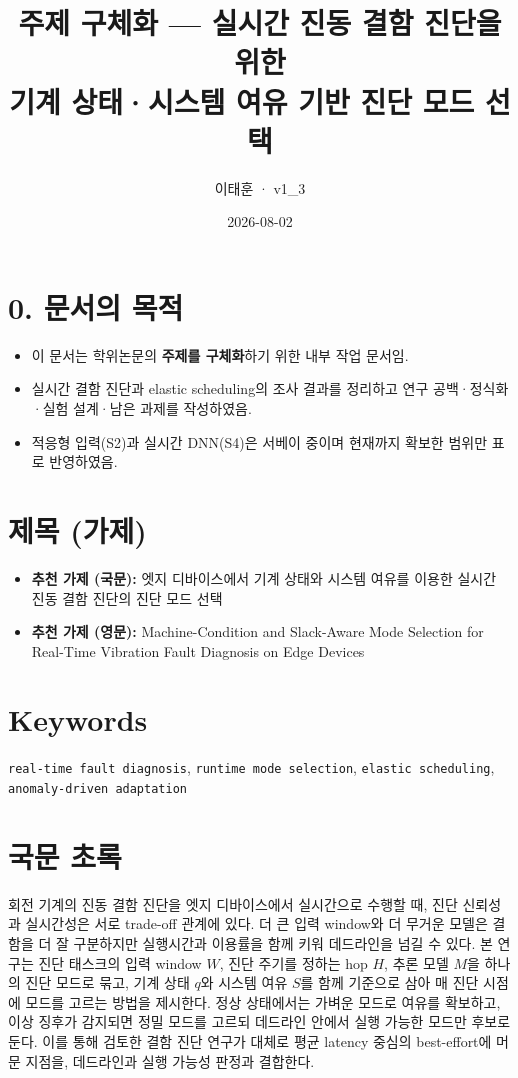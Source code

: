 \documentclass[10pt]{article}
\title{주제 구체화 --- 실시간 진동 결함 진단을 위한\\ 기계 상태·시스템 여유 기반 진단 모드 선택}
\author{이태훈 · v1\_3}
\date{2026-08-02}
\begin{document}
\maketitle

\section*{0. 문서의 목적}
\begin{itemize}
\item 이 문서는 학위논문의 \textbf{주제를 구체화}하기 위한 내부 작업 문서임.
\item 실시간 결함 진단과 elastic scheduling의 조사 결과를 정리하고 연구 공백·정식화·실험 설계·남은 과제를 작성하였음.
\item 적응형 입력(S2)과 실시간 DNN(S4)은 서베이 중이며 현재까지 확보한 범위만 표로 반영하였음.
\end{itemize}

\section{제목 (가제)}
\begin{itemize}
\item \textbf{추천 가제 (국문):} 엣지 디바이스에서 기계 상태와 시스템 여유를 이용한 실시간 진동 결함 진단의 진단 모드 선택
\item \textbf{추천 가제 (영문):} Machine-Condition and Slack-Aware Mode Selection for Real-Time Vibration Fault Diagnosis on Edge Devices
\end{itemize}

\section{Keywords}
\texttt{real-time fault diagnosis}, \texttt{runtime mode selection}, \texttt{elastic scheduling}, \texttt{anomaly-driven adaptation}

\section{국문 초록}
회전 기계의 진동 결함 진단을 엣지 디바이스에서 실시간으로 수행할 때, 진단 신뢰성과 실시간성은 서로 trade-off 관계에 있다. 더 큰 입력 window와 더 무거운 모델은 결함을 더 잘 구분하지만 실행시간과 이용률을 함께 키워 데드라인을 넘길 수 있다. 본 연구는 진단 태스크의 입력 window $W$, 진단 주기를 정하는 hop $H$, 추론 모델 $M$을 하나의 진단 모드로 묶고, 기계 상태 $q$와 시스템 여유 $S$를 함께 기준으로 삼아 매 진단 시점에 모드를 고르는 방법을 제시한다. 정상 상태에서는 가벼운 모드로 여유를 확보하고, 이상 징후가 감지되면 정밀 모드를 고르되 데드라인 안에서 실행 가능한 모드만 후보로 둔다. 이를 통해 검토한 결함 진단 연구가 대체로 평균 latency 중심의 best-effort에 머문 지점을, 데드라인과 실행 가능성 판정과 결합한다.
\end{document}
